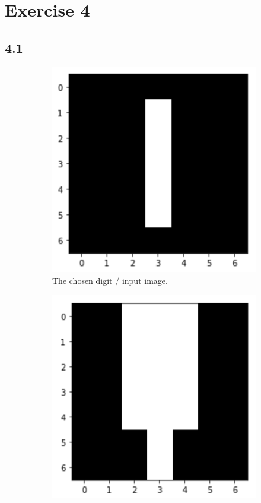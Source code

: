 \section{Exercise 4}
\subsection*{4.1}
\begin{figure}[H]
	\centering
	\begin{subfigure}[b]{0.45\textwidth}
		\centering
		\includegraphics[width=\textwidth]{Materials/digit}
		\caption{The chosen digit / input image.}
	\end{subfigure}
	\hfill
	\begin{subfigure}[b]{0.45\textwidth}
		\centering
		\includegraphics[width=\textwidth]{Materials/m1res}

\end{subfigure}
\end{figure}
